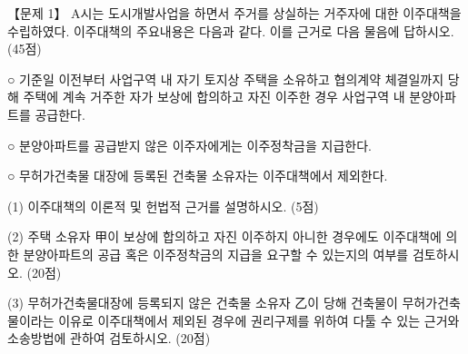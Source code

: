 \begin{longquestion}{【문제 1】}
A시는 도시개발사업을 하면서 주거를 상실하는 거주자에 대한 이주대책을 수립하였다. 이주대책의 주요내용은 다음과 같다. 이를 근거로 다음 물음에 답하시오. (45점) \par
\begin{framedtext}
○ 기준일 이전부터 사업구역 내 자기 토지상 주택을 소유하고 협의계약 체결일까지 당해 주택에 계속 거주한 자가 보상에 합의하고 자진 이주한 경우 사업구역 내 분양아파트를 공급한다. \par
○ 분양아파트를 공급받지 않은 이주자에게는 이주정착금을 지급한다. \par
○ 무허가건축물 대장에 등록된 건축물 소유자는 이주대책에서 제외한다.
\end{framedtext}
\medskip\noindent (1) 이주대책의 이론적 및 헌법적 근거를 설명하시오. (5점) \par
\medskip\noindent (2) 주택 소유자 甲이 보상에 합의하고 자진 이주하지 아니한 경우에도 이주대책에 의한 분양아파트의 공급 혹은 이주정착금의 지급을 요구할 수 있는지의 여부를 검토하시오. (20점) \par
\medskip\noindent (3) 무허가건축물대장에 등록되지 않은 건축물 소유자 乙이 당해 건축물이 무허가건축물이라는 이유로 이주대책에서 제외된 경우에 권리구제를 위하여 다툴 수 있는 근거와 소송방법에 관하여 검토하시오. (20점) \par
\end{longquestion}
